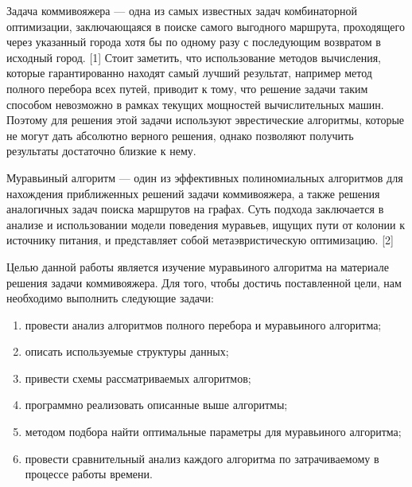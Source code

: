 \Introduction
Задача коммивояжера — одна из самых известных задач комбинаторной оптимизации, заключающаяся в поиске самого выгодного маршрута, проходящего через указанный города хотя бы по одному разу с последующим возвратом в исходный город. [1] Стоит заметить, что использование методов вычисления, которые гарантированно находят самый лучший результат, например метод полного перебора всех путей, приводит к тому, что решение задачи таким способом невозможно в рамках текущих мощностей вычислительных машин. Поэтому для решения этой задачи используют эврестические алгоритмы, которые не могут дать абсолютно верного решения, однако позволяют получить результаты достаточно близкие к нему. 

Муравьиный алгоритм — один из эффективных полиномиальных алгоритмов для нахождения приближенных решений задачи коммивояжера, а также решения аналогичных задач поиска маршрутов на графах. Суть подхода заключается в анализе и использовании модели поведения муравьев, ищущих пути от колонии к источнику питания, и представляет собой метаэвристическую оптимизацию. [2]

Целью данной работы является изучение муравьиного алгоритма на материале решения задачи коммивояжера. Для того, чтобы достичь поставленной цели, нам необходимо выполнить следующие задачи:

\begin{enumerate}
	\item провести анализ алгоритмов полного перебора и муравьиного алгоритма;
	\item описать используемые структуры данных;
	\item привести схемы рассматриваемых алгоритмов;
	\item программно реализовать описанные выше алгоритмы;
	\item методом подбора найти оптимальные параметры для муравьиного алгоритма;
	\item провести сравнительный анализ каждого алгоритма по затрачиваемому в процессе работы времени.
\end{enumerate}